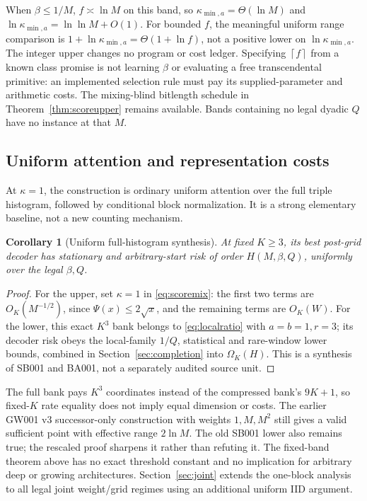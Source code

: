 \documentclass[11pt,letterpaper]{article}
\newtheorem{corollary}[theorem]{Corollary}
\theoremstyle{definition}\newtheorem{definition}[theorem]{Definition}
\theoremstyle{remark}\newtheorem{remark}[theorem]{Remark}
\newcommand{\ceil}[1]{\left\lceil #1\right\rceil}
\newcommand{\unit}[1]{\textsf{#1}}
\begin{document}
When $\beta\le1/M$, $f\asymp\ln M$ on this band, so $\kappa_{\min,a}=\Theta(\ln M)$ and $\ln\kappa_{\min,a}=\ln\ln M+O(1)$. For bounded $f$, the meaningful uniform range comparison is $1+\ln\kappa_{\min,a}=\Theta(1+\ln f)$, not a positive lower on $\ln\kappa_{\min,a}$. The integer upper changes no program or cost ledger. Specifying $\ceil f$ from a known class promise is not learning $\beta$ or evaluating a free transcendental primitive: an implemented selection rule must pay its supplied-parameter and arithmetic costs. The mixing-blind bitlength schedule in Theorem~\ref{thm:scoreupper} remains available. Bands containing no legal dyadic $Q$ have no instance at that $M$.

\subsection{Uniform attention and representation costs}
At $\kappa=1$, the construction is ordinary uniform attention over the full triple histogram, followed by conditional block normalization. It is a strong elementary baseline, not a new counting mechanism.
\begin{corollary}[Uniform full-histogram synthesis]\label{cor:hist}
At fixed $K\ge3$, its best post-grid decoder has stationary and arbitrary-start risk of order $H(M,\beta,Q)$, uniformly over the legal $\beta,Q$.
\end{corollary}
\begin{proof}
For the upper, set $\kappa=1$ in \eqref{eq:scoremix}: the first two terms are $O_K(M^{-1/2})$, since $\Psi(x)\le2\sqrt x$, and the remaining terms are $O_K(W)$. For the lower, this exact $K^3$ bank belongs to \eqref{eq:localratio} with $a=b=1,r=3$; its decoder risk obeys the local-family $1/Q$, statistical and rare-window lower bounds, combined in Section~\ref{sec:completion} into $\Omega_K(H)$. This is a synthesis of \unit{SB001} and \unit{BA001}, not a separately audited source unit.
\end{proof}

The full bank pays $K^3$ coordinates instead of the compressed bank's $9K+1$, so fixed-$K$ rate equality does not imply equal dimension or costs. The earlier \unit{GW001 v3} successor-only construction with weights $1,M,M^2$ still gives a valid sufficient point with effective range $2\ln M$. The old \unit{SB001} lower also remains true; the rescaled proof sharpens it rather than refuting it. The fixed-band theorem above has no exact threshold constant and no implication for arbitrary deep or growing architectures. Section~\ref{sec:joint} extends the one-block analysis to all legal joint weight/grid regimes using an additional uniform IID argument.
\end{document}
